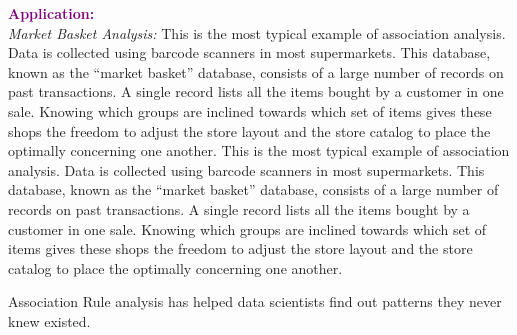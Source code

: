 \textbf{\textcolor{purple}{Application:}} \\
\textit{Market Basket Analysis:} 
This is the most typical example of association analysis. Data is collected using barcode scanners in most supermarkets. This database, known as the “market basket” database, consists of a large number of records on past transactions. A single record lists all the items bought by a customer in one sale. Knowing which groups are inclined towards which set of items gives these shops the freedom to adjust the store layout and the store catalog to place the optimally concerning one another.
This is the most typical example of association analysis. Data is collected using barcode scanners in most supermarkets. This database, known as the “market basket” database, consists of a large number of records on past transactions. A single record lists all the items bought by a customer in one sale. Knowing which groups are inclined towards which set of items gives these shops the freedom to adjust the store layout and the store catalog to place the optimally concerning one another.

Association Rule analysis has helped data scientists find out patterns they never knew existed.

